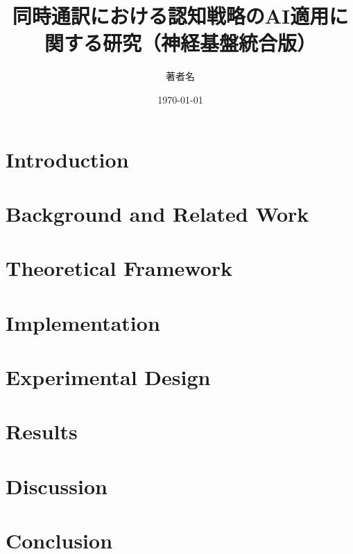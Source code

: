 \documentclass[12pt, a4paper]{article}
\title{同時通訳における認知戦略のAI適用に関する研究（神経基盤統合版）}
\author{著者名}
\date{\today}
\begin{document}
\maketitle

\tableofcontents
\newpage

\section{Introduction}


\section{Background and Related Work}




\section{Theoretical Framework}



\section{Implementation}



\section{Experimental Design}


\section{Results}




\section{Discussion}



\section{Conclusion}




\end{document}
